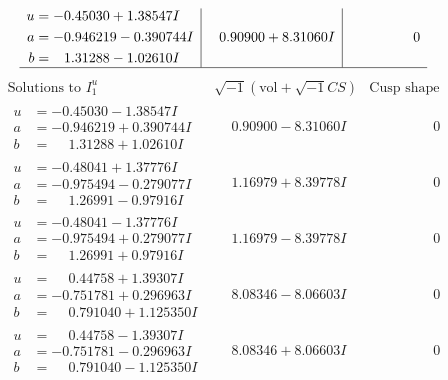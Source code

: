 \documentclass[1p]{elsarticle_modified}
\theoremstyle{definition}
\newcommand{\I}{\sqrt{-1}}
\begin{document}
$$\begin{array}{c|c|c}
\begin{aligned}
u &= -0.45030 + 1.38547 I \\
a &= -0.946219 - 0.390744 I \\
b &= \phantom{-}1.31288 - 1.02610 I\end{aligned}
 & \phantom{-}0.90900 + 8.31060 I & \phantom{-0.000000 } 0\\
 \hline 
 \end{array}$$\newpage$$\begin{array}{c|c|c}  
\text{Solutions to }I^u_{1}& \I (\text{vol} + \sqrt{-1}CS) & \text{Cusp shape}\\
 \hline 
\begin{aligned}
u &= -0.45030 - 1.38547 I \\
a &= -0.946219 + 0.390744 I \\
b &= \phantom{-}1.31288 + 1.02610 I\end{aligned}
 & \phantom{-}0.90900 - 8.31060 I & \phantom{-0.000000 } 0 \\ \hline\begin{aligned}
u &= -0.48041 + 1.37776 I \\
a &= -0.975494 - 0.279077 I \\
b &= \phantom{-}1.26991 - 0.97916 I\end{aligned}
 & \phantom{-}1.16979 + 8.39778 I & \phantom{-0.000000 } 0 \\ \hline\begin{aligned}
u &= -0.48041 - 1.37776 I \\
a &= -0.975494 + 0.279077 I \\
b &= \phantom{-}1.26991 + 0.97916 I\end{aligned}
 & \phantom{-}1.16979 - 8.39778 I & \phantom{-0.000000 } 0 \\ \hline\begin{aligned}
u &= \phantom{-}0.44758 + 1.39307 I \\
a &= -0.751781 + 0.296963 I \\
b &= \phantom{-}0.791040 + 1.125350 I\end{aligned}
 & \phantom{-}8.08346 - 8.06603 I & \phantom{-0.000000 } 0 \\ \hline\begin{aligned}
u &= \phantom{-}0.44758 - 1.39307 I \\
a &= -0.751781 - 0.296963 I \\
b &= \phantom{-}0.791040 - 1.125350 I\end{aligned}
 & \phantom{-}8.08346 + 8.06603 I & \phantom{-0.000000 } 0 \\ \hline\begin{aligned}

\end{aligned}
\end{array}$$
\end{document}
